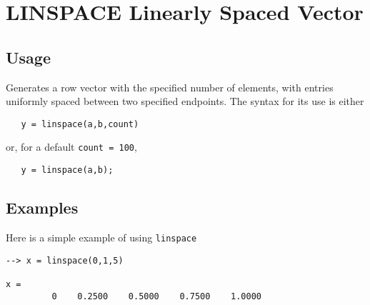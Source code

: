 \section{LINSPACE Linearly Spaced Vector}

\subsection{Usage}

Generates a row vector with the specified number of elements, with
entries uniformly spaced between two specified endpoints.  The syntax
for its use is either
\begin{verbatim}
   y = linspace(a,b,count)
\end{verbatim}
or, for a default \verb|count = 100|,
\begin{verbatim}
   y = linspace(a,b);
\end{verbatim}
\subsection{Examples}

Here is a simple example of using \verb|linspace|
\begin{verbatim}
--> x = linspace(0,1,5)

x = 
         0    0.2500    0.5000    0.7500    1.0000 
\end{verbatim}
